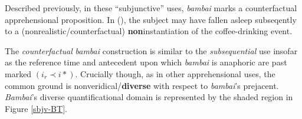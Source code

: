 Described previously, in these ``subjunctive'' uses, \textit{bambai} marks a counterfactual apprehensional proposition. In (), the subject may have fallen asleep subseqently to a (nonrealistic/counterfactual) \textbf{non}instantiation of the coffee-drinking event.

The \textit{counterfactual} \textit{bambai} construction is similar to the \textit{subsequential} use insofar as the reference time and antecedent upon which \textit{bambai} is anaphoric are past marked $ (i_r\prec i*) $. Crucially though, as in other apprehensional uses, the common ground is nonveridical/\textbf{diverse} with respect to \textit{bambai}'s prejacent. \textit{Bambai}'s diverse quantificational domain is represented by the shaded region in Figure \ref{sbjv-BT}.





%
%








